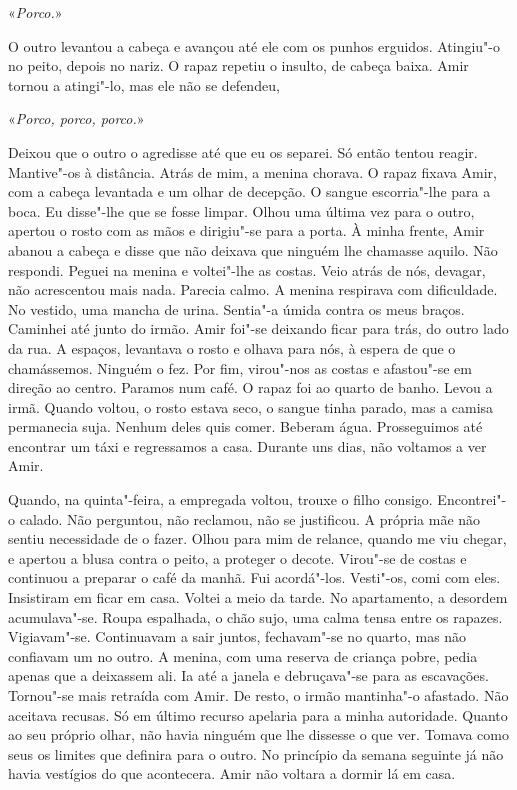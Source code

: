 «\emph{Porco.}»

O outro levantou a cabeça e avançou até ele com os punhos erguidos.
Atingiu"-o no peito, depois no nariz. O rapaz repetiu o insulto, de
cabeça baixa. Amir tornou a atingi"-lo, mas ele não se defendeu,

«\emph{Porco, porco, porco.}»

Deixou que o outro o agredisse até que eu os separei. Só então tentou
reagir. Mantive"-os à distância. Atrás de mim, a menina chorava. O rapaz
fixava Amir, com a cabeça levantada e um olhar de decepção. O sangue
escorria"-lhe para a boca. Eu disse"-lhe que se fosse limpar. Olhou uma
última vez para o outro, apertou o rosto com as mãos e dirigiu"-se para
a porta. À minha frente, Amir abanou a cabeça e disse que não deixava
que ninguém lhe chamasse aquilo. Não respondi. Peguei na menina e
voltei"-lhe as costas. Veio atrás de nós, devagar, não acrescentou mais
nada. Parecia calmo. A menina respirava com dificuldade. No vestido, uma
mancha de urina. Sentia"-a úmida contra os meus braços. Caminhei até
junto do irmão. Amir foi"-se deixando ficar para trás, do outro lado da
rua. A espaços, levantava o rosto e olhava para nós, à espera de que o
chamássemos. Ninguém o fez. Por fim, virou"-nos as costas e afastou"-se
em direção ao centro. Paramos num café. O rapaz foi ao quarto de banho.
Levou a irmã. Quando voltou, o rosto estava seco, o sangue tinha parado,
mas a camisa permanecia suja. Nenhum deles quis comer. Beberam água.
Prosseguimos até encontrar um táxi e regressamos a casa. Durante uns
dias, não voltamos a ver Amir.

Quando, na quinta"-feira, a empregada voltou, trouxe o filho consigo.
Encontrei"-o calado. Não perguntou, não reclamou, não se justificou. A
própria mãe não sentiu necessidade de o fazer. Olhou para mim de
relance, quando me viu chegar, e apertou a blusa contra o peito, a
proteger o decote. Virou"-se de costas e continuou a preparar o
café da manhã. Fui acordá"-los. Vesti"-os, comi com eles. Insistiram
em ficar em casa. Voltei a meio da tarde. No apartamento, a desordem
acumulava"-se. Roupa espalhada, o chão sujo, uma calma tensa entre os
rapazes. Vigiavam"-se. Continuavam a sair juntos, fechavam"-se no
quarto, mas não confiavam um no outro. A menina, com uma reserva de
criança pobre, pedia apenas que a deixassem ali. Ia até a janela e
debruçava"-se para as escavações. Tornou"-se mais retraída com Amir. De
resto, o irmão mantinha"-o afastado. Não aceitava recusas. Só em último
recurso apelaria para a minha autoridade. Quanto ao seu próprio olhar,
não havia ninguém que lhe dissesse o que ver. Tomava como seus os
limites que definira para o outro. No princípio da semana seguinte já
não havia vestígios do que acontecera. Amir não voltara a dormir lá em
casa.

